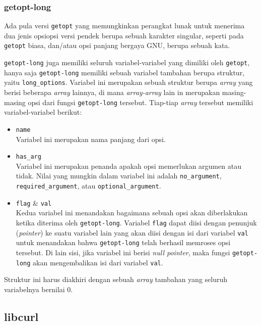 \subsubsection{getopt-long}
\label{sec:cmodules-getopt-long}

Ada pula versi \verb|getopt| yang memungkinkan perangkat lunak untuk menerima dua jenis opsi\textemdash opsi versi pendek berupa sebuah karakter singular, seperti pada \verb|getopt| biasa, dan/atau opsi panjang bergaya GNU, berupa sebuah kata.

\verb|getopt-long| juga memiliki seluruh variabel-variabel yang dimiliki oleh \verb|getopt|, hanya saja \verb|getopt-long| memiliki sebuah variabel tambahan berupa struktur, yaitu \verb|long_options|. Variabel ini merupakan sebuah struktur berupa \textit{array} yang berisi beberapa \textit{array} lainnya, di mana \textit{array-array} lain in merupakan masing-masing opsi dari fungsi \verb|getopt-long| tersebut. Tiap-tiap \textit{array} tersebut memiliki variabel-variabel berikut:

\begin{itemize}
	\item \verb|name|\\
	Variabel ini merupakan nama panjang dari opsi.
	\item \verb|has_arg|\\
	Variabel ini merupakan penanda apakah opsi memerlukan argumen atau tidak. Nilai yang mungkin dalam variabel ini adalah \verb|no_argument|, \verb|required_argument|, atau \verb|optional_argument|.
	\item \verb|flag| \& \verb|val|\\ 
	Kedua variabel ini menandakan bagaimana sebuah opsi akan diberlakukan ketika diterima oleh \verb|getopt-long|. Variabel \verb|flag| dapat diisi dengan penunjuk (\textit{pointer}) ke suatu variabel lain yang akan diisi dengan isi dari variabel \verb|val| untuk menandakan bahwa \verb|getopt-long| telah berhasil memroses opsi tersebut. Di lain sisi, jika variabel ini berisi \textit{null pointer}, maka fungsi \verb|getopt-long| akan mengembalikan isi dari variabel \verb|val|.
\end{itemize}
\noindent
Struktur ini harus diakhiri dengan sebuah \textit{array} tambahan yang seluruh variabelnya bernilai 0.

\subsection{libcurl \cite{stenberg:2022:everythingcurl}}
\label{sec:cmodules-libcurl}

